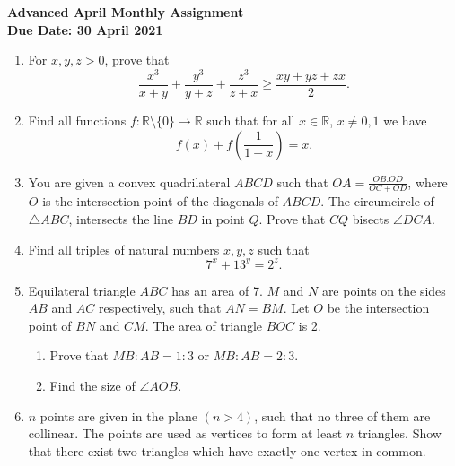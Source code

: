\documentclass{article}
\begin{document}
\thispagestyle{empty}

\begin{center}
  \textbf{\Large Advanced April Monthly Assignment}
  \\ \vspace{1em}
  \textbf{\large Due Date: 30 April 2021}
\end{center}

\vspace{12pt}

\begin{enumerate}[itemsep=18pt]

\vspace{6pt}
\item %
For $x,y,z > 0$, prove that
\[ \frac{x^3}{x+y} +\frac{y^3}{y+z} +\frac{z^3}{z+x} \geq \frac{xy+yz+zx}{2}. \]


\item %
Find all functions $f:\mathbb{R}\setminus\{0\} \to \mathbb{R}$ such that for all $x \in \mathbb{R}$, $x \neq 0,1$ we have
\[ f(x) +f\left(\frac{1}{1-x}\right) = x. \]


\item %
You are given a convex quadrilateral $ABCD$ such that $OA = \frac{OB.OD}{OC+OD}$, where $O$ is the intersection point of the diagonals of $ABCD$.
The circumcircle of $\triangle ABC$, intersects the line $BD$ in point $Q$.
Prove that $CQ$ bisects $\angle DCA.$


\item %
Find all triples of natural numbers $x,y,z$ such that $$7^x +13^y = 2^z.$$


\item %
Equilateral triangle $ABC$ has an area of 7.
$M$ and $N$ are points on the sides $AB$ and $AC$ respectively, such that $AN = BM$.
Let $O$ be the intersection point of $BN$ and $CM$.
The area of triangle $BOC$ is 2.
\begin{enumerate}
	\item Prove that $MB:AB = 1:3$ or $MB:AB = 2:3$.
	\item Find the size of $\angle AOB$.
\end{enumerate}


\item %
$n$ points are given in the plane $(n > 4)$, such that no three of them are collinear.
The points are used as vertices to form at least $n$ triangles.
Show that there exist two triangles which have exactly one vertex in common.

\end{enumerate}
\end{document}
